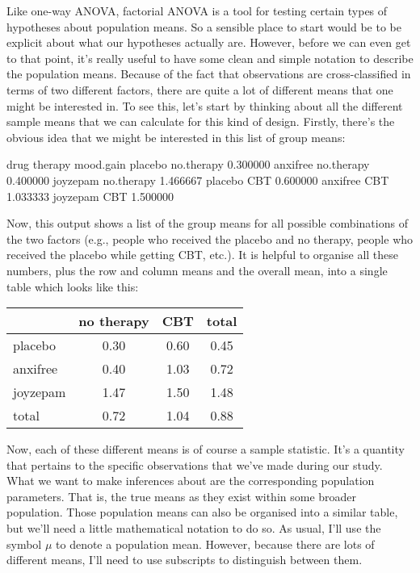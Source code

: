 
Like one-way ANOVA, factorial ANOVA is a tool for testing certain types of hypotheses about population means. So a sensible place to start would be to be explicit about what our hypotheses actually are. However, before we can even get to that point, it's really useful to have some clean and simple notation to describe the population means. Because of the fact that observations are cross-classified in terms of two different factors, there are quite a lot of different means that one might be interested in. To see this, let's start by thinking about all the different sample means that we can calculate for this kind of design. Firstly, there's the obvious idea that we might be interested in this list of group means:
\newpage
\begin{rblock1}
drug     therapy     mood.gain
placebo  no.therapy  0.300000
anxifree no.therapy  0.400000
joyzepam no.therapy  1.466667
placebo     CBT      0.600000
anxifree    CBT      1.033333
joyzepam    CBT      1.500000
\end{rblock1}
Now, this output shows a list of the group means for all possible combinations of the two factors (e.g., people who received the placebo and no therapy, people who received the placebo while getting CBT, etc.). It is helpful to organise all these numbers, plus the row and column means and the overall mean, into a single table which looks like this:

\begin{center}
\begin{tabular}{l|cc|c}
& no therapy & CBT & total \\ \hline
placebo & 0.30 & 0.60 & 0.45 \\
anxifree & 0.40 & 1.03 & 0.72 \\
joyzepam & 1.47 & 1.50 & 1.48 \\ \hline
total & 0.72 & 1.04 & 0.88
\end{tabular}
\end{center}

Now, each of these different means is of course a sample statistic. It's a quantity that pertains to the specific observations that we've made during our study. What we want to make inferences about are the corresponding population parameters. That is, the true means as they exist within some broader population. Those population means can also be organised into a similar table, but we'll need a little mathematical notation to do so. As usual, I'll use the symbol $\mu$ to denote a population mean. However, because there are lots of different means, I'll need to use subscripts to distinguish between them. 

